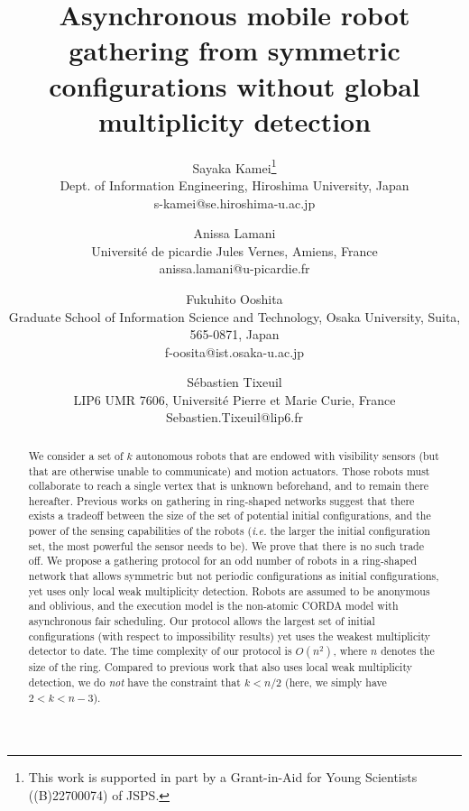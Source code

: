 \documentclass[11pt]{article}
\begin{document}
\title{Asynchronous mobile robot gathering from symmetric configurations without global multiplicity detection}

\author{Sayaka Kamei\footnote{
  This work is supported in part by a Grant-in-Aid for Young
  Scientists ((B)22700074) of JSPS.}\\
   Dept. of Information Engineering, Hiroshima University, Japan \\
 s-kamei@se.hiroshima-u.ac.jp \\
   \and
   Anissa Lamani \\
   Universit\'{e} de picardie Jules Vernes, Amiens, France \\
  anissa.lamani@u-picardie.fr\\
  \and
   Fukuhito Ooshita \\
  Graduate School of Information Science and Technology, Osaka University, Suita, 565-0871, Japan \\
  f-oosita@ist.osaka-u.ac.jp\\
  \and
   S\'{e}bastien Tixeuil \\
  LIP6 UMR 7606, Universit\'{e} Pierre et Marie Curie, France \\
  Sebastien.Tixeuil@lip6.fr
   }

\date{}
\maketitle

\begin{abstract}
We consider a set of $k$ autonomous robots that are endowed with visibility sensors (but that are otherwise unable to communicate) and motion actuators. Those robots must collaborate to reach a single vertex that is unknown beforehand, and to remain there hereafter. Previous works on gathering in ring-shaped networks suggest that there exists a tradeoff between the size of the set of potential initial configurations, and the power of the sensing capabilities of the robots (\emph{i.e.} the larger the initial configuration set, the most powerful the sensor needs to be).
We prove that there is no such trade off. We propose a gathering protocol for an odd number of robots in a ring-shaped network that allows symmetric but not periodic configurations as initial configurations, yet uses only local weak multiplicity detection. Robots are assumed to be anonymous and oblivious, and the execution model is the non-atomic CORDA model with asynchronous fair scheduling. Our protocol allows the largest set of initial configurations (with respect to impossibility results) yet uses the weakest multiplicity detector to date. The time complexity of our protocol is $O(n^2)$, where $n$ denotes the size of the ring. Compared to previous work that also uses local weak multiplicity detection, we do \emph{not} have the constraint that $k<n/2$ (here, we simply have $2<k<n-3$).
\end{abstract}
\end{document}
